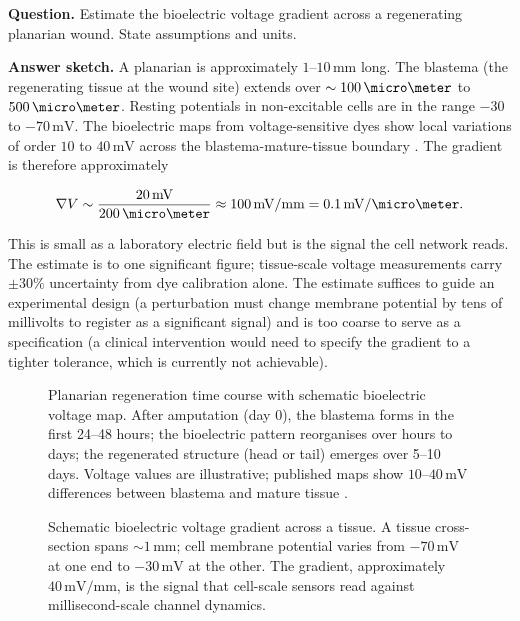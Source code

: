 \begin{estimation}
\textbf{Question.} Estimate the bioelectric voltage gradient across a
regenerating planarian wound. State assumptions and units.

\textbf{Answer sketch.} A planarian is approximately $1$--$10\,\text{mm}$
long. The blastema (the regenerating tissue at the wound site) extends
over $\sim 100\,\micro\meter$ to $500\,\micro\meter$. Resting
potentials in non-excitable cells are in the range $-30$ to
$-70\,\text{mV}$. The bioelectric maps from voltage-sensitive dyes show
local variations of order $10$ to $40\,\text{mV}$ across the
blastema-mature-tissue boundary \cite{paper:v6c13-adams-vmem-2007,
paper:v6c13-oviedo-planarian-2010}. The gradient is therefore
approximately

\[
\nabla V \sim \frac{20\,\text{mV}}{200\,\micro\meter}
\approx 100\,\text{mV}/\text{mm} = 0.1\,\text{mV}/\micro\meter.
\]

This is small as a laboratory electric field but is the signal the
cell network reads. The estimate is to one significant figure;
tissue-scale voltage measurements carry $\pm 30\%$ uncertainty from
dye calibration alone. The estimate suffices to guide an experimental
design (a perturbation must change membrane potential by tens of
millivolts to register as a significant signal) and is too coarse to
serve as a specification (a clinical intervention would need to
specify the gradient to a tighter tolerance, which is currently not
achievable).
\end{estimation}

\begin{figure}[ht]
  \centering
  
  \caption{Planarian regeneration time course with schematic
  bioelectric voltage map. After amputation (day 0), the blastema
  forms in the first 24--48 hours; the bioelectric pattern reorganises
  over hours to days; the regenerated structure (head or tail)
  emerges over 5--10 days. Voltage values are illustrative; published
  maps show $10$--$40\,\text{mV}$ differences between blastema and
  mature tissue \cite{paper:v6c13-adams-vmem-2007,
  paper:v6c13-oviedo-planarian-2010}.}
  \label{fig:vol06ch13-planarian-timeline}
\end{figure}

\begin{figure}[ht]
  \centering
  
  \caption{Schematic bioelectric voltage gradient across a tissue. A
  tissue cross-section spans $\sim 1\,\text{mm}$; cell membrane
  potential varies from $-70\,\text{mV}$ at one end to $-30\,\text{mV}$
  at the other. The gradient, approximately $40\,\text{mV}/\text{mm}$,
  is the signal that cell-scale sensors read against
  millisecond-scale channel dynamics.}
  \label{fig:vol06ch13-voltage-gradient}
\end{figure}

